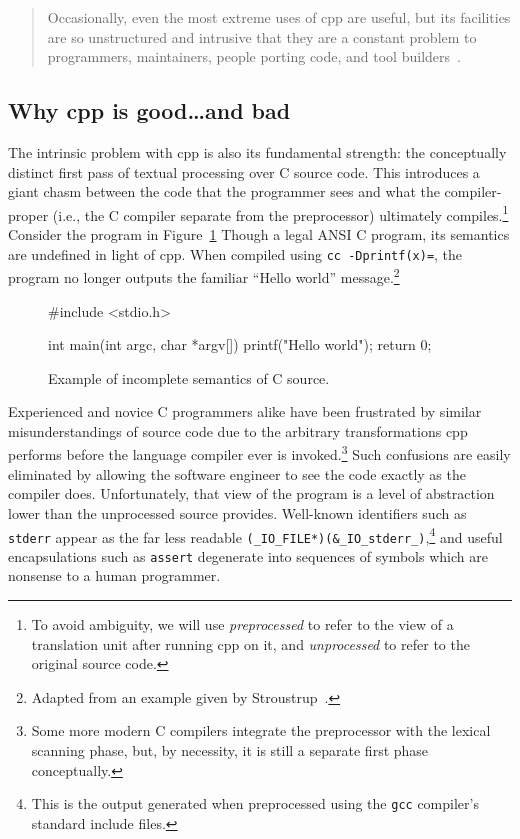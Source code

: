 \documentclass{article}
\newcommand{\Cpp}{\mbox{\textsf{cpp}}}
\newcommand{\C}{\mbox{\textsf{C}}}
\newcommand{\ie}{i.e.,}
\newcommand{\figref}[1]{Figure~\ref{#1}}
\begin{document}
\begin{quotation}
\noindent Occasionally, even the most extreme uses of \Cpp{} are useful, but its
facilities are so unstructured and intrusive that they are a constant
problem to programmers, maintainers, people porting code, and tool
builders~\cite[p.~424]{Stroustrup94}.
\end{quotation}

\subsection{Why \Cpp{} is good\ldots and bad}

The intrinsic problem with \Cpp{} is also its fundamental strength: the
conceptually distinct first pass of textual processing over \C{} source
code.  This introduces a giant chasm between the code that the
programmer sees and what the compiler-proper (\ie{} the \C{} compiler
separate from the preprocessor) ultimately compiles.\footnote{To avoid
  ambiguity, we will use \emph{preprocessed} to refer to the view of a
  translation unit after running \Cpp{} on it, and \emph{unprocessed} to
  refer to the original source code.} Consider the program in
\figref{fig:badmain} Though a legal ANSI \C{} program, its semantics are
undefined in light of \Cpp{}.  When compiled using \texttt{cc
  -Dprintf(x)=}, the program no longer outputs the familiar ``Hello
world'' message.\footnote{Adapted from an example given by
  Stroustrup~\cite[p.~423]{Stroustrup94}.}

\begin{figure}[hbt]
\label{fig:badmain}
\begin{center}
\begin{pseudocode}
#include <stdio.h>

int main(int argc, char *argv[]) {
  printf("Hello world");
  return 0;
}
\end{pseudocode}
\caption{Example of incomplete semantics of \C{} source.}
\end{center}
\end{figure}

Experienced and novice \C{} programmers alike have been frustrated by
similar misunderstandings of source code due to the arbitrary
transformations \Cpp{} performs before the language compiler ever is
invoked.\footnote{Some more modern \C{} compilers integrate the
  preprocessor with the lexical scanning phase, but, by necessity, it is
  still a separate first phase conceptually.}  Such confusions are
easily eliminated by allowing the software engineer to see the code
exactly as the compiler does.  Unfortunately, that view of the program
is a level of abstraction lower than the unprocessed source provides.
Well-known identifiers such as \texttt{stderr} appear as the far less
readable \texttt{(\_IO\_FILE*)(\&\_IO\_stderr\_)},\footnote{This is the
  output generated when preprocessed using the \texttt{gcc} compiler's
  standard include files.} and useful encapsulations such as
\texttt{assert} degenerate into sequences of symbols which are nonsense
to a human programmer.
\end{document}
